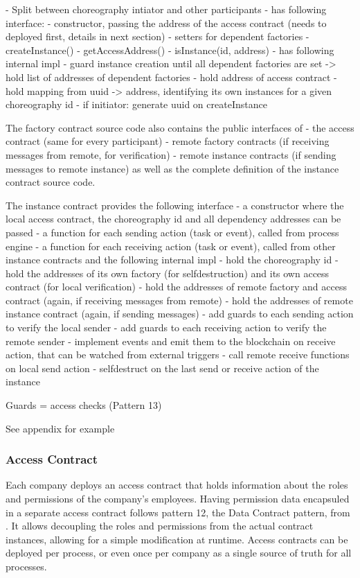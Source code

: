 \documentclass[runningheads]{llncs}
\begin{document}
- Split between choreography intiator and other participants
- has following interface:
  - constructor, passing the address of the access contract (needs to deployed first, details in next section)
  - setters for dependent factories
  - createInstance()
  - getAccessAddress()
  - isInstance(id, address)
- has following internal impl
  - guard instance creation until all dependent factories are set
  -> hold list of addresses of dependent factories
  - hold address of access contract
  - hold mapping from uuid -> address, identifying its own instances for a given choreography id
  - if initiator: generate uuid on createInstance

The factory contract source code also contains the public interfaces of
  - the access contract (same for every participant)
  - remote factory contracts (if receiving messages from remote, for verification)
  - remote instance contracts (if sending messages to remote instance)
as well as the complete definition of the instance contract source code.

The instance contract provides the following interface
  - a constructor where the local access contract, the choreography id and all dependency addresses can be passed
  - a function for each sending action (task or event), called from process engine
  - a function for each receiving action (task or event), called from other instance contracts
and the following internal impl
  - hold the choreography id
  - hold the addresses of its own factory (for selfdestruction) and its own access contract (for local verification)
  - hold the addresses of remote factory and access contract (again, if receiving messages from remote)
  - hold the addresses of remote instance contract (again, if sending messages)
  - add guards to each sending action to verify the local sender
  - add guards to each receiving action to verify the remote sender
  - implement events and emit them to the blockchain on receive action, that can be watched from external triggers
  - call remote receive functions on local send action
  - selfdestruct on the last send or receive action of the instance

Guards = access checks (Pattern 13)

See appendix for example %

\subsubsection{Access Contract}

Each company deploys an access contract that holds information about the roles and permissions of the company's employees.
Having permission data encapsuled in a separate access contract follows pattern 12, the Data Contract pattern, from \cite{xu2018pattern}.
It allows decoupling the roles and permissions from the actual contract instances, allowing for a simple modification at runtime.
Access contracts can be deployed per process, or even once per company as a single source of truth for all processes.
\end{document}
